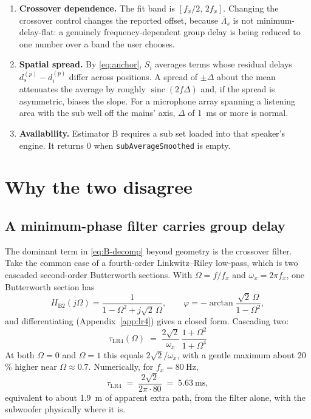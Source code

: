 \documentclass[11pt,a4paper]{article}
\newcommand{\code}[1]{\texttt{\small #1}}
\begin{document}
\begin{enumerate}[leftmargin=*]
\item \textbf{Crossover dependence.} The fit band is $[f_x/2,\, 2f_x]$. Changing
  the crossover control changes the reported offset, because $\bar\Lambda_s$ is not
  minimum-delay-flat: a genuinely frequency-dependent group delay is being
  reduced to one number over a band the user chooses.

\item \textbf{Spatial spread.} By \eqref{eq:anchor}, $S_i$ averages terms whose
  residual delays $d_s^{(p)} - d_i^{(p)}$ differ across positions. A spread of
  $\pm\Delta$ about the mean attenuates the average by roughly
  $\operatorname{sinc}(2 f \Delta)$ and, if the spread is asymmetric, biases the
  slope. For a microphone array spanning a listening area with the sub well off
  the mains' axis, $\Delta$ of \SI{1}{\milli\second} or more is normal.

\item \textbf{Availability.} Estimator B requires a sub set loaded into that
  speaker's engine. It returns $0$ when \code{subAverageSmoothed} is empty.
\end{enumerate}

\section{Why the two disagree}
\label{sec:disagree}

\subsection{A minimum-phase filter carries group delay}

The dominant term in \eqref{eq:B-decomp} beyond geometry is the crossover
filter. Take the common case of a fourth-order Linkwitz--Riley low-pass, which
is two cascaded second-order Butterworth sections. With $\Omega = f/f_x$ and
$\omega_x = 2\pi f_x$, one Butterworth section has
%
\begin{equation}
  H_{\mathrm{B2}}(j\Omega) = \frac{1}{1 - \Omega^2 + j\sqrt{2}\,\Omega},
  \qquad
  \varphi = -\arctan\!\frac{\sqrt{2}\,\Omega}{1-\Omega^2},
\end{equation}
%
and differentiating (Appendix~\ref{app:lr4}) gives a closed form. Cascading two:
%
\begin{equation}
  \boxed{\;
  \tau_{\mathrm{LR4}}(\Omega)
  \;=\; \frac{2\sqrt{2}}{\omega_x}\,\frac{1+\Omega^2}{1+\Omega^4}\;}
  \label{eq:lr4}
\end{equation}
%
At both $\Omega = 0$ and $\Omega = 1$ this equals $2\sqrt{2}/\omega_x$, with a
gentle maximum about 20\,\% higher near $\Omega \approx 0.7$. Numerically, for
$f_x = \SI{80}{\hertz}$,
%
\begin{equation}
  \tau_{\mathrm{LR4}} \;=\; \frac{2\sqrt{2}}{2\pi \cdot 80}
  \;=\; \SI{5.63}{\milli\second},
\end{equation}
%
equivalent to about \SI{1.9}{\metre} of apparent extra path, from the filter
alone, with the subwoofer physically where it is.
\end{document}
